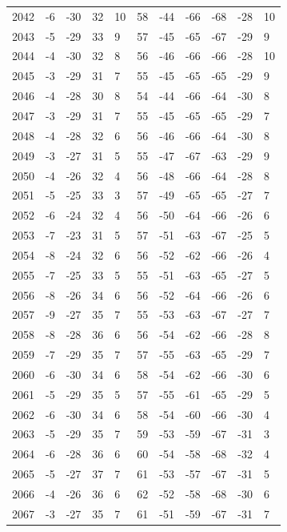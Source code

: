 \begin{table}[H]
\begin{tabular}{lllllllllll}
2042 & -6 & -30 & 32 & 10 & 58 & -44 & -66 & -68 & -28 & 10 \\
2043 & -5 & -29 & 33 & 9 & 57 & -45 & -65 & -67 & -29 & 9 \\
2044 & -4 & -30 & 32 & 8 & 56 & -46 & -66 & -66 & -28 & 10 \\
2045 & -3 & -29 & 31 & 7 & 55 & -45 & -65 & -65 & -29 & 9 \\
2046 & -4 & -28 & 30 & 8 & 54 & -44 & -66 & -64 & -30 & 8 \\
2047 & -3 & -29 & 31 & 7 & 55 & -45 & -65 & -65 & -29 & 7 \\
2048 & -4 & -28 & 32 & 6 & 56 & -46 & -66 & -64 & -30 & 8 \\
2049 & -3 & -27 & 31 & 5 & 55 & -47 & -67 & -63 & -29 & 9 \\
2050 & -4 & -26 & 32 & 4 & 56 & -48 & -66 & -64 & -28 & 8 \\
2051 & -5 & -25 & 33 & 3 & 57 & -49 & -65 & -65 & -27 & 7 \\
2052 & -6 & -24 & 32 & 4 & 56 & -50 & -64 & -66 & -26 & 6 \\
2053 & -7 & -23 & 31 & 5 & 57 & -51 & -63 & -67 & -25 & 5 \\
2054 & -8 & -24 & 32 & 6 & 56 & -52 & -62 & -66 & -26 & 4 \\
2055 & -7 & -25 & 33 & 5 & 55 & -51 & -63 & -65 & -27 & 5 \\
2056 & -8 & -26 & 34 & 6 & 56 & -52 & -64 & -66 & -26 & 6 \\
2057 & -9 & -27 & 35 & 7 & 55 & -53 & -63 & -67 & -27 & 7 \\
2058 & -8 & -28 & 36 & 6 & 56 & -54 & -62 & -66 & -28 & 8 \\
2059 & -7 & -29 & 35 & 7 & 57 & -55 & -63 & -65 & -29 & 7 \\
2060 & -6 & -30 & 34 & 6 & 58 & -54 & -62 & -66 & -30 & 6 \\
2061 & -5 & -29 & 35 & 5 & 57 & -55 & -61 & -65 & -29 & 5 \\
2062 & -6 & -30 & 34 & 6 & 58 & -54 & -60 & -66 & -30 & 4 \\
2063 & -5 & -29 & 35 & 7 & 59 & -53 & -59 & -67 & -31 & 3 \\
2064 & -6 & -28 & 36 & 6 & 60 & -54 & -58 & -68 & -32 & 4 \\
2065 & -5 & -27 & 37 & 7 & 61 & -53 & -57 & -67 & -31 & 5 \\
2066 & -4 & -26 & 36 & 6 & 62 & -52 & -58 & -68 & -30 & 6 \\
2067 & -3 & -27 & 35 & 7 & 61 & -51 & -59 & -67 & -31 & 7 \\

\end{tabular}
\end{table}
